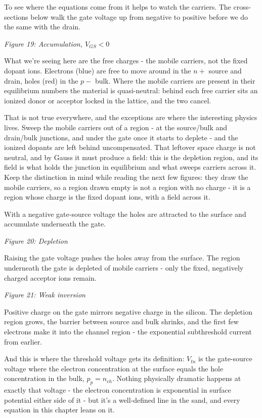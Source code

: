 To see where the equations come from it helps to watch the carriers. The
cross-sections below walk the gate voltage up from negative to positive
before we do the same with the drain.


{
\centering
{}
}

\emph{Figure 19: Accumulation, \(V_{GS} < 0\)}

What we're seeing here are the free charges - the mobile carriers, not
the fixed dopant ions. Electrons (blue) are free to move around in the
\(n+\) source and drain, holes (red) in the \(p-\) bulk. Where the
mobile carriers are present in their equilibrium numbers the material is
quasi-neutral: behind each free carrier sits an ionized donor or
acceptor locked in the lattice, and the two cancel.

That is not true everywhere, and the exceptions are where the
interesting physics lives. Sweep the mobile carriers out of a region -
at the source/bulk and drain/bulk junctions, and under the gate once it
starts to deplete - and the ionized dopants are left behind
uncompensated. That leftover space charge is not neutral, and by Gauss
it must produce a field: this is the depletion region, and its field is
what holds the junction in equilibrium and what sweeps carriers across
it. Keep the distinction in mind while reading the next few figures:
they draw the mobile carriers, so a region drawn empty is not a region
with no charge - it is a region whose charge is the fixed dopant ions,
with a field across it.

With a negative gate-source voltage the holes are attracted to the
surface and accumulate underneath the gate.


{
\centering
{}
}

\emph{Figure 20: Depletion}

Raising the gate voltage pushes the holes away from the surface. The
region underneath the gate is depleted of mobile carriers - only the
fixed, negatively charged acceptor ions remain.


{
\centering
{}
}

\emph{Figure 21: Weak inversion}

Positive charge on the gate mirrors negative charge in the silicon. The
depletion region grows, the barrier between source and bulk shrinks, and
the first few electrons make it into the channel region - the
exponential subthreshold current from earlier.

And this is where the threshold voltage gets its definition: \(V_{tn}\)
is the gate-source voltage where the electron concentration at the
surface equals the hole concentration in the bulk, \(p_p = n_{ch}\).
Nothing physically dramatic happens at exactly that voltage - the
electron concentration is exponential in surface potential either side
of it - but it's a well-defined line in the sand, and every equation in
this chapter leans on it.

